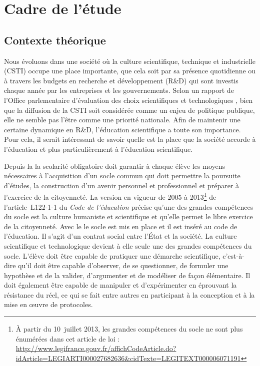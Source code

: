 \chapter{Cadre de l’étude}\label{cadre}
\section{Contexte théorique}
Nous évoluons dans une société où la culture scientifique, technique et industrielle (CSTI) occupe une place importante, que cela soit par sa présence quotidienne ou à travers les budgets en recherche et développement (R\&D) qui sont investis chaque année par les entreprises et les gouvernements. Selon un rapport de l’Office parlementaire d’évaluation des choix scientifiques et technologiques \cite{Olivier2014}, bien que la diffusion de la CSTI soit considérée comme un enjeu de politique publique, elle ne semble pas l’être comme une priorité nationale. Afin de maintenir une certaine dynamique en R\&D, l’éducation scientifique a toute son importance. Pour cela, il serait intéressant de savoir quelle est la place que la société accorde à l’éducation et plus particulièrement à l’éducation scientifique.

Depuis la  la scolarité obligatoire doit garantir à chaque élève les moyens nécessaires à l’acquisition d’un socle commun qui doit permettre la poursuite d’études, la construction d’un avenir personnel et professionnel et préparer à l’exercice de la citoyenneté. La version en vigueur de 2005 à 2013\footnote{À partir du 10~juillet 2013, les grandes compétences du socle ne sont plus énumérées dans cet article de loi : \url{http://www.legifrance.gouv.fr/affichCodeArticle.do?idArticle=LEGIARTI000027682636&cidTexte=LEGITEXT000006071191}} de l’article~\mbox{L122-1-1} du \textit{Code de l’éducation} %
précise qu’une des grandes compétences du socle est la culture humaniste et scientifique et qu’elle permet le libre exercice de la citoyenneté. Avec le  le socle est mis en place et il est inséré au code de l’éducation. Il s’agit d’un contrat social entre l’État et la société. La culture scientifique et technologique devient à elle seule une des grandes compétences du socle. L’élève doit être capable de pratiquer une démarche scientifique, c’est-à-dire qu’il doit être capable d’observer, de se questionner, de formuler une hypothèse et de la valider, d’argumenter et de modéliser de façon élémentaire. Il doit également être capable de manipuler et d’expérimenter en éprouvant la résistance du réel, ce qui se fait entre autres en participant à la conception et à la mise en œuvre de protocoles.

